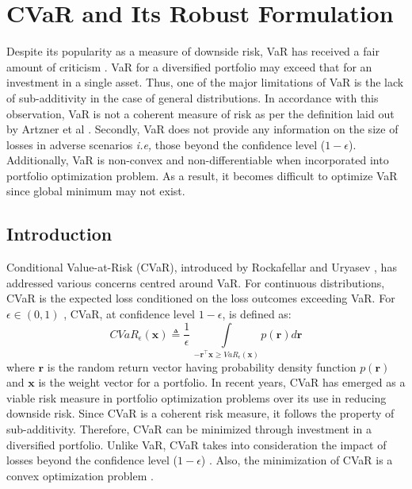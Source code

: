 \chapter{CVaR and Its Robust Formulation}

Despite its popularity as a measure of downside risk, VaR has received a fair amount of criticism \cite{capinski_risk,zhu,lim}. VaR for a diversified portfolio may exceed that for an investment in a single asset. Thus, one of the major limitations of VaR is the lack of sub-additivity in the case of general distributions. In accordance with this observation, VaR is not a coherent measure of risk as per the definition laid out by Artzner et al \cite{artzner}. Secondly, VaR does not provide any information on the size of losses in adverse scenarios \textit{i.e,} those beyond the confidence level ($1-\epsilon$). Additionally, VaR is non-convex and non-differentiable when incorporated into portfolio optimization problem. As a result, it becomes difficult to optimize VaR since global minimum may not exist. 

\section{Introduction}

Conditional Value-at-Risk (CVaR), introduced by Rockafellar and Uryasev \cite{rockafellar1,rockafellar2}, has addressed various concerns centred around VaR. For continuous distributions, CVaR is the expected loss conditioned on the loss outcomes exceeding VaR. For $\epsilon \in (0,1)$ , CVaR, at confidence level $1-\epsilon$, is defined as:
\begin{equation}
\label{eq:6.1}
CVaR_{\epsilon}(\mathbf{x}) \triangleq \frac{1}{\epsilon} \, \int \limits_{-\mathbf{r}^{\top}\mathbf{x} \geq VaR_{\epsilon}(\mathbf{x})} p(\mathbf{r})  d\mathbf{r}
\end{equation}
where $\mathbf{r}$ is the random return vector having probability density function $p(\mathbf{r})$ and $\mathbf{x}$ is the weight vector for a portfolio. In recent years, CVaR has emerged as a viable risk measure in portfolio optimization problems over its use in reducing downside risk. Since CVaR is a coherent risk measure, it follows the property of sub-additivity. Therefore, CVaR can be minimized through investment in a diversified portfolio. Unlike VaR, CVaR takes into consideration the impact of losses beyond the confidence level ($1-\epsilon$) \cite{capinski_risk}. Also, the minimization of CVaR is a convex optimization problem \cite{lim}.

